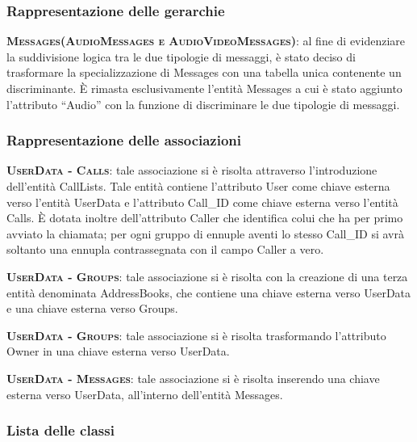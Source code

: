 \subsubsection{Rappresentazione delle gerarchie}

\begin{description}
	\item{\scshape\bfseries Messages(AudioMessages e AudioVideoMessages)}: al fine di evidenziare la suddivisione logica tra le due tipologie di messaggi, è stato deciso di trasformare la specializzazione di Messages con una tabella unica contenente un discriminante. È rimasta esclusivamente l'entità Messages a cui è stato aggiunto l'attributo ``Audio'' con la funzione di discriminare le due tipologie di messaggi.
\end{description}

\subsubsection{Rappresentazione delle associazioni}

\begin{description}
	\item{\scshape\bfseries UserData - Calls}: tale associazione si è risolta attraverso l'introduzione dell'entità CallLists. Tale entità contiene l'attributo User come chiave esterna verso l'entità UserData e l'attributo Call\_ID come chiave esterna verso l'entità Calls. È dotata inoltre dell'attributo Caller che identifica colui che ha per primo avviato la chiamata; per ogni gruppo di ennuple aventi lo stesso Call\_ID si avrà soltanto una ennupla contrassegnata con il campo Caller a vero.
	\item{\scshape\bfseries UserData - Groups}: tale associazione si è risolta con la creazione di una terza entità denominata AddressBooks, che contiene una chiave esterna verso UserData e una chiave esterna verso Groups.
	\item{\scshape\bfseries UserData - Groups}: tale associazione si è risolta trasformando l'attributo Owner in una chiave esterna verso UserData.
	\item{\scshape\bfseries UserData - Messages}: tale associazione si è risolta inserendo una chiave esterna verso UserData, all'interno dell'entità Messages.
\end{description}

\subsubsection{Lista delle classi}

